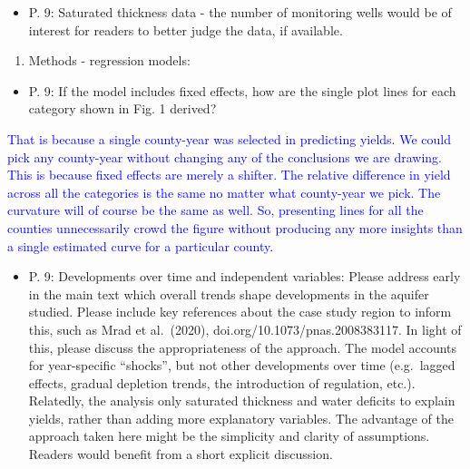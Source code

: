 \documentclass[
]{article}
\providecommand{\tightlist}{%
  \setlength{\itemsep}{0pt}\setlength{\parskip}{0pt}}
\begin{document}
\begin{itemize}
\tightlist
\item
  P. 9: Saturated thickness data - the number of monitoring wells would
  be of interest for readers to better judge the data, if available.
\end{itemize}

\textcolor{blue}{}

\begin{enumerate}
\def\labelenumi{\arabic{enumi}.}
\setcounter{enumi}{6}
\tightlist
\item
  Methods - regression models:
\end{enumerate}

\begin{itemize}
\tightlist
\item
  P. 9: If the model includes fixed effects, how are the single plot
  lines for each category shown in Fig. 1 derived?
\end{itemize}

\textcolor{blue}{
That is because a single county-year was selected in predicting yields. We could pick any county-year without changing any of the conclusions we are drawing. This is because fixed effects are merely a shifter. The relative difference in yield across all the categories is the same no matter what county-year we pick. The curvature will of course be the same as well. So, presenting lines for all the counties unnecessarily crowd the figure without producing any more insights than a single estimated curve for a particular county.
}

\begin{itemize}
\tightlist
\item
  P. 9: Developments over time and independent variables: Please address
  early in the main text which overall trends shape developments in the
  aquifer studied. Please include key references about the case study
  region to inform this, such as Mrad et al.~(2020),
  doi.org/10.1073/pnas.2008383117. In light of this, please discuss the
  appropriateness of the approach. The model accounts for year-specific
  ``shocks'', but not other developments over time (e.g.~lagged effects,
  gradual depletion trends, the introduction of regulation, etc.).
  Relatedly, the analysis only saturated thickness and water deficits to
  explain yields, rather than adding more explanatory variables. The
  advantage of the approach taken here might be the simplicity and
  clarity of assumptions. Readers would benefit from a short explicit
  discussion.
\end{itemize}
\end{document}
